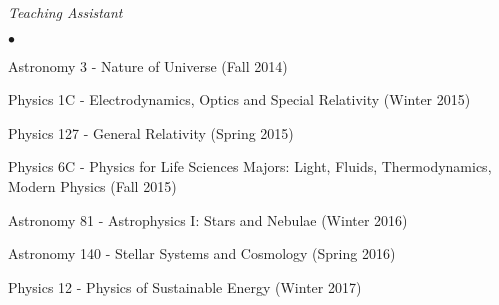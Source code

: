 \documentclass[margin, line]{res}
\newenvironment{list2}{
  \begin{list}{$\bullet$}{%
      \setlength{\itemsep}{0in}
      \setlength{\parsep}{0in} \setlength{\parskip}{0in}
      \setlength{\topsep}{0in} \setlength{\partopsep}{0in} 
      \setlength{\leftmargin}{0.2in}}}{\end{list}}
\begin{document}
\begin{resume}
{\em Teaching Assistant} \hfill {}\\
\begin{list2}
	\item Astronomy 3 - Nature of Universe (Fall 2014)
	\item Physics 1C - Electrodynamics, Optics and Special Relativity (Winter 2015)
	\item Physics 127 - General Relativity (Spring 2015)
	\item Physics 6C - Physics for Life Sciences Majors: Light, Fluids, Thermodynamics, Modern Physics (Fall 2015)
	\item Astronomy 81 - Astrophysics I: Stars and Nebulae (Winter 2016)
	\item Astronomy 140 - Stellar Systems and Cosmology (Spring 2016)
	\item Physics 12 - Physics of Sustainable Energy (Winter 2017)
\end{list2}







\end{resume}
\end{document}
